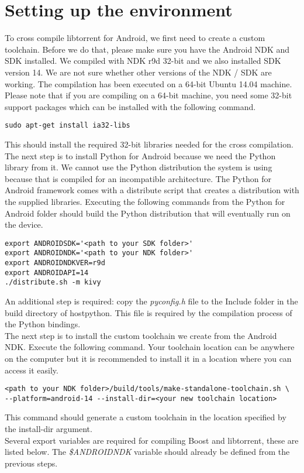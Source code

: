 \section{Setting up the environment}
	To cross compile libtorrent for Android, we first need to create a custom toolchain. Before we do that, please make sure you have the Android NDK and SDK installed. We compiled with NDK r9d 32-bit and we also installed SDK version 14. We are not sure whether other versions of the NDK / SDK are working. The compilation has been executed on a 64-bit Ubuntu 14.04 machine. Please note that if you are compiling on a 64-bit machine, you need some 32-bit support packages which can be installed with the following command.
	\begin{lstlisting}
sudo apt-get install ia32-libs
	\end{lstlisting}
	This should install the required 32-bit libraries needed for the cross compilation. The next step is to install Python for Android because we need the Python library from it. We cannot use the Python distribution the system is using because that is compiled for an incompatible architecture. The Python for Android framework comes with a distribute script that creates a distribution with the supplied libraries. Executing the following commands from the Python for Android folder should build the Python distribution that will eventually run on the device.
	\begin{lstlisting}
export ANDROIDSDK='<path to your SDK folder>'
export ANDROIDNDK='<path to your NDK folder>'
export ANDROIDNDKVER=r9d
export ANDROIDAPI=14
./distribute.sh -m kivy
	\end{lstlisting}
	An additional step is required: copy the \emph{pyconfig.h} file to the Include folder in the build directory of hostpython. This file is required by the compilation process of the Python bindings.\\
	The next step is to install the custom toolchain we create from the Android NDK. Execute the following command. Your toolchain location can be anywhere on the computer but it is recommended to install it in a location where you can access it easily.
	\begin{lstlisting}
<path to your NDK folder>/build/tools/make-standalone-toolchain.sh \
--platform=android-14 --install-dir=<your new toolchain location>
	\end{lstlisting}
	This command should generate a custom toolchain in the location specified by the install-dir argument.\\
	Several export variables are required for compiling Boost and libtorrent, these are listed below. The \emph{\$ANDROIDNDK} variable should already be defined from the previous steps.
